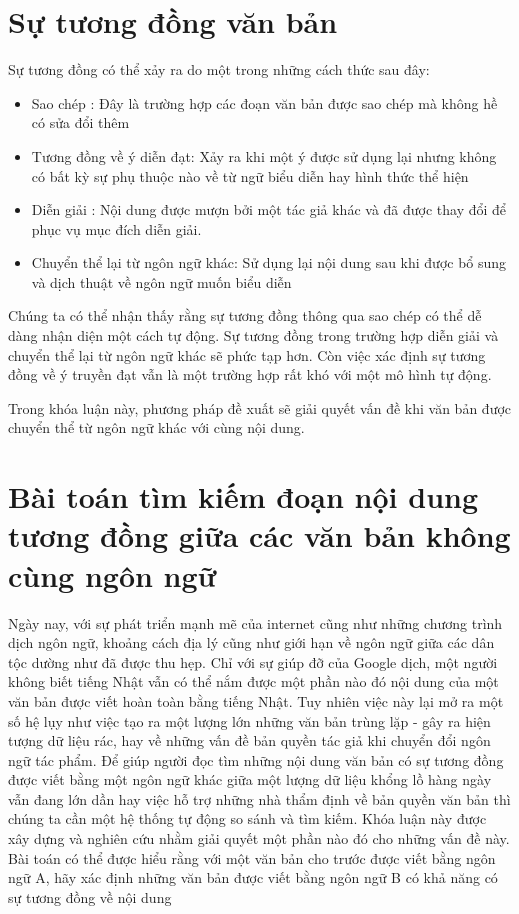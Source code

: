 \documentclass[12pt]{report}
\begin{document}
\section{Sự tương đồng văn bản}
Sự tương đồng có thể xảy ra do một trong những cách thức sau đây:
\begin{itemize}
	\item Sao chép : Đây là trường hợp các đoạn văn bản được sao chép mà không hề có sửa đổi thêm
	\item Tương đồng về ý diễn đạt: Xảy ra khi một ý được sử dụng lại nhưng không có bất kỳ sự phụ thuộc nào về từ ngữ biểu diễn hay hình thức thể hiện
	\item Diễn giải : Nội dung được mượn bởi một tác giả khác và đã được thay đổi để phục vụ mục đích diễn giải.
	\item Chuyển thể lại từ ngôn ngữ khác: Sử dụng lại nội dung sau khi được bổ sung và dịch thuật về ngôn ngữ muốn biểu diễn
\end{itemize}

Chúng ta có thể nhận thấy rằng sự tương đồng thông qua sao chép có thể dễ dàng nhận diện một cách tự động. Sự tương đồng trong trường hợp diễn giải và chuyển thể lại từ ngôn ngữ khác sẽ phức tạp hơn. Còn việc xác định sự tương đồng về ý truyền đạt vẫn là một trường hợp rất khó với một mô hình tự động.

Trong khóa luận này, phương pháp đề xuất sẽ giải quyết vấn đề khi văn bản được chuyển thể từ ngôn ngữ khác với cùng nội dung.

\section{Bài toán tìm kiếm đoạn nội dung tương đồng giữa các văn bản không cùng ngôn ngữ}
Ngày nay, với sự phát triển mạnh mẽ của internet cũng như những chương trình dịch ngôn ngữ, khoảng cách địa lý cũng như giới hạn về ngôn ngữ giữa các dân tộc dường như đã được thu hẹp. Chỉ với sự giúp đỡ của Google dịch, một người không biết tiếng Nhật vẫn có thể nắm được một phần nào đó nội dung của một văn bản được viết hoàn toàn bằng tiếng Nhật. Tuy nhiên việc này lại mở ra một số hệ lụy như việc tạo ra một lượng lớn những văn bản trùng lặp - gây ra hiện tượng dữ liệu rác, hay về những vấn đề bản quyền tác giả khi chuyển đổi ngôn ngữ tác phẩm. Để giúp người đọc tìm những nội dung văn bản có sự tương đồng được viết bằng một ngôn ngữ khác giữa một lượng dữ liệu khổng lồ hàng ngày vẫn đang lớn dần hay việc hỗ trợ những nhà thẩm định về bản quyền văn bản thì chúng ta cần một hệ thống tự động so sánh và tìm kiếm. Khóa luận này được xây dựng và nghiên cứu nhằm giải quyết một phần nào đó cho những vấn đề này. Bài toán có thể được hiểu rằng với một văn bản cho trước được viết bằng ngôn ngữ A, hãy xác định những văn bản được viết bằng ngôn ngữ B có khả năng có sự tương đồng về nội dung
\end{document}
